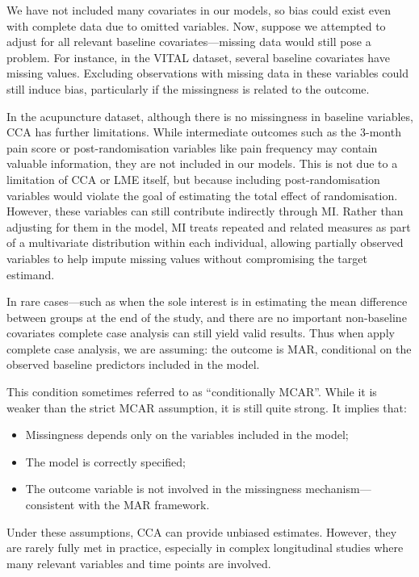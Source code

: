 \documentclass{article}
\providecommand{\tightlist}{%
  \setlength{\itemsep}{0pt}\setlength{\parskip}{0pt}}
\begin{document}
We have not included many covariates in our models, so bias could exist
even with complete data due to omitted variables. Now, suppose we
attempted to adjust for all relevant baseline covariates---missing data
would still pose a problem. For instance, in the VITAL dataset, several
baseline covariates have missing values. Excluding observations with
missing data in these variables could still induce bias, particularly if
the missingness is related to the outcome.

In the acupuncture dataset, although there is no missingness in baseline
variables, CCA has further limitations. While intermediate outcomes such
as the 3-month pain score or post-randomisation variables like pain
frequency may contain valuable information, they are not included in our
models. This is not due to a limitation of CCA or LME itself, but
because including post-randomisation variables would violate the goal of
estimating the total effect of randomisation. However, these variables
can still contribute indirectly through MI. Rather than adjusting for
them in the model, MI treats repeated and related measures as part of a
multivariate distribution within each individual, allowing partially
observed variables to help impute missing values without compromising
the target estimand.

In rare cases---such as when the sole interest is in estimating the mean
difference between groups at the end of the study, and there are no
important non-baseline covariates complete case analysis can still yield
valid results. Thus when apply complete case analysis, we are assuming:
the outcome is MAR, conditional on the observed baseline predictors
included in the model.

This condition sometimes referred to as ``conditionally MCAR''. While it
is weaker than the strict MCAR assumption, it is still quite strong. It
implies that:

\begin{itemize}
\tightlist
\item
  Missingness depends only on the variables included in the model;
\item
  The model is correctly specified;
\item
  The outcome variable is not involved in the missingness
  mechanism---consistent with the MAR framework.
\end{itemize}

Under these assumptions, CCA can provide unbiased estimates. However,
they are rarely fully met in practice, especially in complex
longitudinal studies where many relevant variables and time points are
involved.
\end{document}
